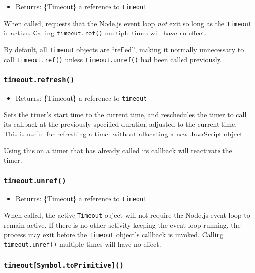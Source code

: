 \begin{itemize}
\tightlist
\item
  Returns: \{Timeout\} a reference to \texttt{timeout}
\end{itemize}

When called, requests that the Node.js event loop \emph{not} exit so
long as the \texttt{Timeout} is active. Calling \texttt{timeout.ref()}
multiple times will have no effect.

By default, all \texttt{Timeout} objects are ``ref'ed'', making it
normally unnecessary to call \texttt{timeout.ref()} unless
\texttt{timeout.unref()} had been called previously.

\subsubsection{\texorpdfstring{\texttt{timeout.refresh()}}{timeout.refresh()}}\label{timeout.refresh}

\begin{itemize}
\tightlist
\item
  Returns: \{Timeout\} a reference to \texttt{timeout}
\end{itemize}

Sets the timer's start time to the current time, and reschedules the
timer to call its callback at the previously specified duration adjusted
to the current time. This is useful for refreshing a timer without
allocating a new JavaScript object.

Using this on a timer that has already called its callback will
reactivate the timer.

\subsubsection{\texorpdfstring{\texttt{timeout.unref()}}{timeout.unref()}}\label{timeout.unref}

\begin{itemize}
\tightlist
\item
  Returns: \{Timeout\} a reference to \texttt{timeout}
\end{itemize}

When called, the active \texttt{Timeout} object will not require the
Node.js event loop to remain active. If there is no other activity
keeping the event loop running, the process may exit before the
\texttt{Timeout} object's callback is invoked. Calling
\texttt{timeout.unref()} multiple times will have no effect.

\subsubsection{\texorpdfstring{\texttt{timeout{[}Symbol.toPrimitive{]}()}}{timeout{[}Symbol.toPrimitive{]}()}}\label{timeoutsymbol.toprimitive}


